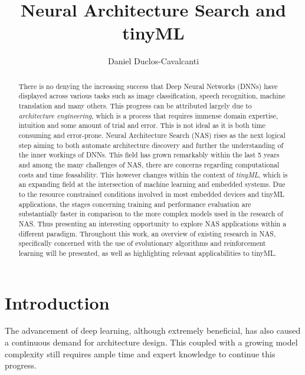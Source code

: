 \documentclass[10pt,        %
               a4paper,     %
               journal,     %
               ]{IEEEtran}
\makeatletter
\def\markboth#1#2{\def\leftmark{\@IEEEcompsoconly{\sffamily}\MakeUppercase{\protect#1}}%
\def\rightmark{\@IEEEcompsoconly{\sffamily}\MakeUppercase{\protect#2}}}
\makeatother
\begin{document}
%
\title{Neural Architecture Search and tinyML}

\author{Daniel Duclos-Cavalcanti}

\markboth{Seminar for VLSI Entwurfsverfahren, Summer Term 2022}%
{Daniel Duclos-Cavalcanti: Network Architecture Search (NAS)}

\maketitle

\begin{abstract}
There is no denying the increasing success that Deep Neural Networks (DNNs)
have displayed across various tasks such as image classification, speech recognition, machine translation
and many others. This progress can be attributed largely due to \textit{architecture engineering},
which is a process that requires immense domain expertise, intuition and some amount of trial
and error. This is not ideal as it is both time consuming and error-prone. Neural Architecture Search (NAS)
rises as the next logical step aiming to both automate architecture discovery and further the understanding
of the inner workings of DNNs. This field has grown remarkably within the last 5 years and among the many challenges
of NAS, there are concerns regarding computational costs and time feasability. This however changes within the context
of \textit{tinyML}, which is an expanding field at the intersection of machine learning and embedded systems.
Due to the resource constrained conditions involved in most embedded devices and tinyML
applications, the stages concerning training and performance evaluation are substantially faster in comparison to
the more complex models used in the research of NAS. Thus presenting an interesting opportunity to explore NAS applications
within a different paradigm. Throughout this work, an overview of existing research in NAS, specifically concerned
with the use of evolutionary algorithms and reinforcement learning will be presented, as well as highlighting
relevant applicabilities to tinyML.

\end{abstract}

\section{Introduction}
The advancement of deep learning, although extremely beneficial, has also caused a continuous demand for
architecture design. This coupled with a growing model complexity still requires ample time and expert knowledge to
continue this progress.
\end{document}
